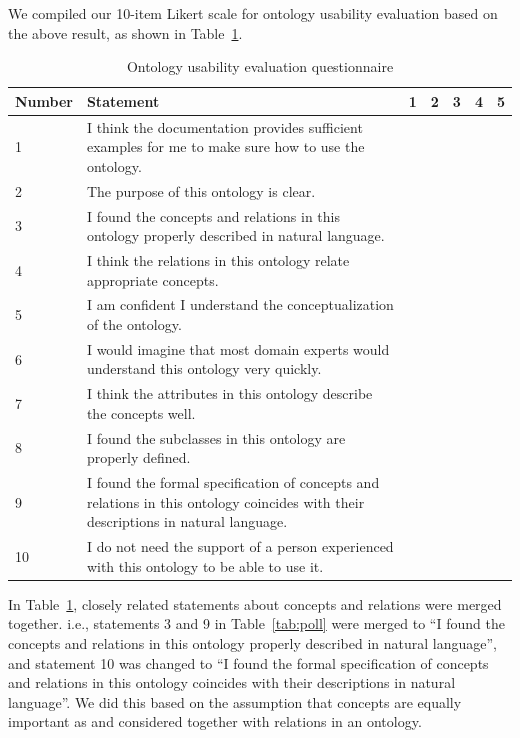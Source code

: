 We compiled our 10-item Likert scale for ontology usability evaluation based on the above result, as shown in Table~\ref{tab:ous-draft}.
\begin{table}
	\begin{center}
		\caption{Ontology usability evaluation questionnaire}
		\label{tab:ous-draft}
		\begin{tabular}{|p{}|p{}|l|l|l|l|l|}
			\hline Number & Statement & 1 & 2 & 3 & 4 & 5 \\ 
			\hline 1 & I think the documentation provides sufficient examples for me to make sure how to use the ontology. &  &  &  &  &  \\ 
			\hline 2 & The purpose of this ontology is clear. &  &  &  &  &  \\ 
			\hline 3 & I found the concepts and relations in this ontology properly described in natural language. &  &  &  &  &  \\ 
			\hline 4 & I think the relations in this ontology relate appropriate concepts. &  &  &  &  &  \\ 
			\hline 5 & I am confident I understand the conceptualization of the ontology. &  &  &  &  &  \\ 
			\hline 6 & I would imagine that most domain experts would understand this ontology very quickly. &  &  &  &  &  \\ 
			\hline 7 & I think the attributes in this ontology describe the concepts well. &  &  &  &  &  \\ 
			\hline 8 & I found the subclasses in this ontology are properly defined. &  &  &  &  &  \\ 
			\hline 9 & I found the formal specification of concepts and relations in this ontology coincides with their descriptions in natural language. &  &  &  &  &  \\ 
			\hline 10 & I do not need the support of a person experienced with this ontology to be able to use it. &  &  &  &  &  \\ 
			\hline 
		\end{tabular} 
	\end{center}
\end{table}
In Table~\ref{tab:ous-draft}, closely related statements about concepts
and relations were merged together. i.e., statements
3 and 9 in Table~\ref{tab:poll} were merged to ``I found the
concepts and relations in this ontology properly described
in natural language'', and statement 10 was
changed to ``I found the formal specification of concepts
and relations in this ontology coincides with
their descriptions in natural language''. We did this
based on the assumption that concepts are equally
important as and considered together with relations
in an ontology.

